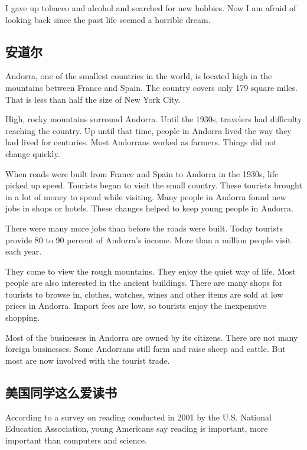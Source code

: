 I gave up tobacco and alcohol and searched for new
hobbies. Now I am afraid of looking back since the past
life seemed a horrible dream.
\subsection{安道尔}
Andorra, one of the smallest countries in the world, is located
high in the mountains between France and Spain.
The country covers only 179 square miles. That is less
than half the size of New York City.

High, rocky mountains surround Andorra. Until the
1930s, travelers had difficulty reaching the country. Up until
that time, people in Andorra lived the way they had lived
for centuries. Most Andorrans worked as farmers. Things
did not change quickly.

When roads were built from France and Spain to Andorra
in the 1930s, life picked up speed. Tourists began
to visit the small country. These tourists brought in a lot of
money to spend while visiting. Many people in Andorra
found new jobs in shops or hotels. These changes helped
to keep young people in Andorra.

There were many more jobs than before the roads were
built. Today tourists provide 80 to 90 percent of Andorra's
income. More than a million people visit each year.

They come to view the rough mountains. They enjoy the
quiet way of life. Most people are also interested in the ancient buildings. There are many shops for tourists to browse
in, clothes, watches, wines and other items are sold at low
prices in Andorra. Import fees are low, so tourists enjoy the
inexpensive shopping.

Most of the businesses in Andorra are owned by its citizens.
There are not many foreign businesses. Some Andorrans still farm and raise sheep and cattle. But most
are now involved with the tourist trade.

\subsection{美国同学这么爱读书}
According to a survey on reading conducted in 2001 by
the U.S. National Education Association, young Americans
say reading is important, more important than computers
and science.


